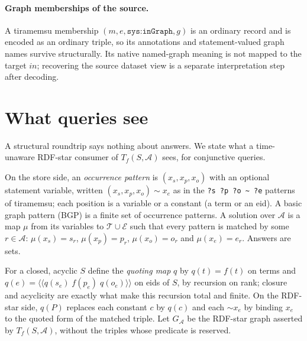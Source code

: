 \documentclass[11pt]{article}
\theoremstyle{plain}
\theoremstyle{definition}
\theoremstyle{remark}
\newcommand{\Stmt}{\mathcal E}
\newcommand{\Term}{\mathcal T}
\newcommand{\sys}[1]{\texttt{sys:#1}}
\begin{document}
\paragraph{Graph memberships of the source.}
A tiramemsu membership $(m,e,\sys{inGraph},g)$ is an ordinary record and is encoded
as an ordinary triple, so its annotations and statement-valued graph names survive
structurally. Its native named-graph meaning is not mapped to the target
$\mathit{in}$; recovering the source dataset view is a separate interpretation step
after decoding.

\section{What queries see}\label{sec:queries}
A structural roundtrip says nothing about answers. We state what a time-unaware
RDF-star consumer of $T_f(S,\mathcal A)$ sees, for conjunctive queries.

On the store side, an \emph{occurrence pattern} is $(x_s,x_p,x_o)$ with an optional
statement variable, written $(x_s,x_p,x_o)\mathbin{\sim}x_e$ as in the
\texttt{?s ?p ?o \textasciitilde{} ?e} patterns of tiramemsu; each position is a
variable or a constant (a term or an eid). A basic graph pattern (BGP) is a finite set
of occurrence patterns. A solution over $\mathcal A$ is a map $\mu$ from its variables
to $\Term\cup\Stmt$ such that every pattern is matched by some $r\in\mathcal A$:
$\mu(x_s)=s_r$, $\mu(x_p)=p_r$, $\mu(x_o)=o_r$ and $\mu(x_e)=e_r$. Answers are sets.

For a closed, acyclic $S$ define the \emph{quoting map} $q$ by $q(t)=f(t)$ on terms
and $q(e)=\langle\!\langle q(s_e)\;f(p_e)\;q(o_e)\rangle\!\rangle$ on eids of $S$,
by recursion on rank; closure and acyclicity are exactly what make this recursion
total and finite. On the RDF-star side, $q(P)$ replaces each constant $c$ by $q(c)$
and each $\sim x_e$ by binding $x_e$ to the quoted form of the matched triple. Let
$G_{\mathcal A}$ be the RDF-star graph asserted by $T_f(S,\mathcal A)$, without the
triples whose predicate is reserved.
\end{document}
